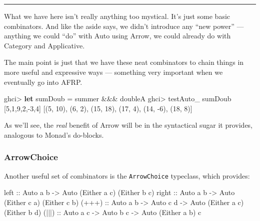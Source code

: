\documentclass[]{article}
\newenvironment{Shaded}{}{}
\newcommand{\KeywordTok}[1]{\textcolor[rgb]{0.00,0.44,0.13}{\textbf{{#1}}}}
\newcommand{\DataTypeTok}[1]{\textcolor[rgb]{0.56,0.13,0.00}{{#1}}}
\newcommand{\DecValTok}[1]{\textcolor[rgb]{0.25,0.63,0.44}{{#1}}}
\newcommand{\OtherTok}[1]{\textcolor[rgb]{0.00,0.44,0.13}{{#1}}}
\newcommand{\FunctionTok}[1]{\textcolor[rgb]{0.02,0.16,0.49}{{#1}}}
\newcommand{\NormalTok}[1]{{#1}}
\begin{document}
\begin{center}\rule{0.5\linewidth}{\linethickness}\end{center}

What we have here isn't really anything too mystical. It's just some basic
combinators. And like the aside says, we didn't introduce any ``new power'' ---
anything we could ``do'' with Auto using Arrow, we could already do with
Category and Applicative.

The main point is just that we have these neat combinators to chain things in
more useful and expressive ways --- something very important when we eventually
go into AFRP.

\begin{Shaded}
\begin{Highlighting}[]
\NormalTok{ghci}\FunctionTok{>} \KeywordTok{let} \NormalTok{sumDoub }\FunctionTok{=} \NormalTok{summer }\FunctionTok{&&&} \NormalTok{doubleA}
\NormalTok{ghci}\FunctionTok{>} \NormalTok{testAuto_ sumDoub [}\DecValTok{5}\NormalTok{,}\DecValTok{1}\NormalTok{,}\DecValTok{9}\NormalTok{,}\DecValTok{2}\NormalTok{,}\FunctionTok{-}\DecValTok{3}\NormalTok{,}\DecValTok{4}\NormalTok{]}
\NormalTok{[(}\DecValTok{5}\NormalTok{, }\DecValTok{10}\NormalTok{), (}\DecValTok{6}\NormalTok{, }\DecValTok{2}\NormalTok{), (}\DecValTok{15}\NormalTok{, }\DecValTok{18}\NormalTok{), (}\DecValTok{17}\NormalTok{, }\DecValTok{4}\NormalTok{), (}\DecValTok{14}\NormalTok{, }\FunctionTok{-}\DecValTok{6}\NormalTok{), (}\DecValTok{18}\NormalTok{, }\DecValTok{8}\NormalTok{)]}
\end{Highlighting}
\end{Shaded}

As we'll see, the \emph{real} benefit of Arrow will be in the syntactical sugar
it provides, analogous to Monad's do-blocks.

\subsubsection{ArrowChoice}\label{arrowchoice}

Another useful set of combinators is the \texttt{ArrowChoice} typeclass, which
provides:

\begin{Shaded}
\begin{Highlighting}[]
\OtherTok{left  ::} \DataTypeTok{Auto} \NormalTok{a b }\OtherTok{->} \DataTypeTok{Auto} \NormalTok{(}\DataTypeTok{Either} \NormalTok{a c) (}\DataTypeTok{Either} \NormalTok{b c)}
\OtherTok{right ::} \DataTypeTok{Auto} \NormalTok{a b }\OtherTok{->} \DataTypeTok{Auto} \NormalTok{(}\DataTypeTok{Either} \NormalTok{c a) (}\DataTypeTok{Either} \NormalTok{c b)}
\OtherTok{(+++) ::} \DataTypeTok{Auto} \NormalTok{a b }\OtherTok{->} \DataTypeTok{Auto} \NormalTok{c d }\OtherTok{->} \DataTypeTok{Auto} \NormalTok{(}\DataTypeTok{Either} \NormalTok{a c) (}\DataTypeTok{Either} \NormalTok{b d)}
\OtherTok{(|||) ::} \DataTypeTok{Auto} \NormalTok{a c }\OtherTok{->} \DataTypeTok{Auto} \NormalTok{b c }\OtherTok{->} \DataTypeTok{Auto} \NormalTok{(}\DataTypeTok{Either} \NormalTok{a b) c}
\end{Highlighting}
\end{Shaded}
\end{document}
